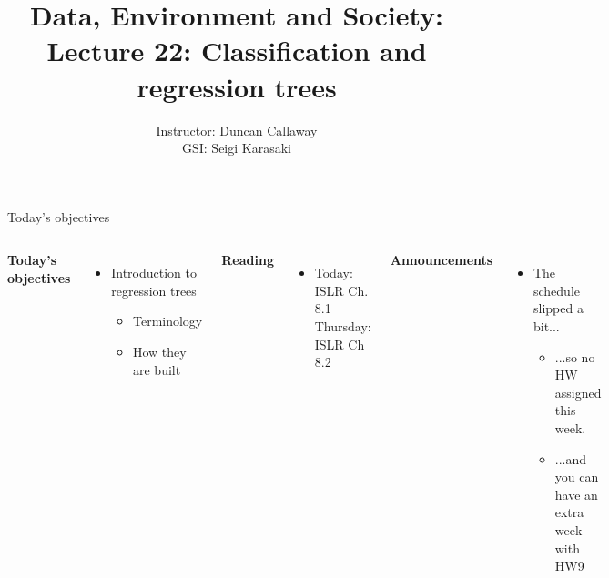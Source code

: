 \documentclass[mathserif, aspectratio=169]{beamer}
\title[Lecture 22] %
{Data, Environment and Society: \\{Lecture 22: Classification and regression trees}}
\author[ER190C: Data, Environment and Society] 
{Instructor: Duncan Callaway\\
GSI: Seigi Karasaki}
\institute[UC Berkeley] %
 {\small{ \bf November 6, 2018}}
\date[November 6, 2018]
\begin{document}
\frame{
  \titlepage
}


\begin{frame}{Today's objectives}

\begin{columns}


\textbf{Today's objectives}
\begin{itemize}
\item Introduction to regression trees
\begin{itemize}
\item Terminology
\item How they are built
\end{itemize}
\end{itemize}

\textbf{Reading}
\begin{itemize}
\item Today: ISLR Ch. 8.1
\itme Thursday: ISLR Ch 8.2
\end{itemize}

\textbf{Announcements}
\begin{itemize}
\item The schedule slipped a bit...
\begin{itemize}
\item ...so no HW assigned this week.
\item ...and you can have an extra week with HW9
\end{itemize}
\end{itemize}



\end{columns}
\end{frame}
\end{document}
